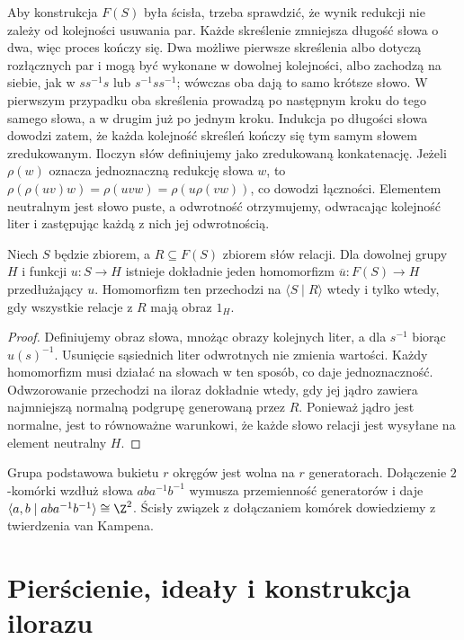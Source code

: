\begin{uwaga}
Aby konstrukcja $F(S)$ była ścisła, trzeba sprawdzić,
że wynik redukcji nie zależy od kolejności usuwania par.
Każde skreślenie zmniejsza długość słowa o dwa, więc
proces kończy się. Dwa możliwe pierwsze skreślenia
albo dotyczą rozłącznych par i mogą być wykonane
w dowolnej kolejności, albo zachodzą na siebie,
jak w $ss^{-1}s$ lub $s^{-1}ss^{-1}$; wówczas
oba dają to samo krótsze słowo. W pierwszym przypadku
oba skreślenia prowadzą po następnym kroku do tego samego
słowa, a w drugim już po jednym kroku. Indukcja po długości
słowa dowodzi zatem, że każda kolejność skreśleń kończy się
tym samym słowem zredukowanym.
Iloczyn słów definiujemy jako zredukowaną konkatenację.
Jeżeli $\rho(w)$ oznacza jednoznaczną redukcję słowa $w$, to
$\rho(\rho(uv)w)=\rho(uvw)=\rho(u\rho(vw))$,
co dowodzi łączności. Elementem neutralnym jest słowo puste,
a odwrotność otrzymujemy, odwracając kolejność liter
i zastępując każdą z nich jej odwrotnością.
\end{uwaga}
\begin{twierdzenie}
Niech $S$ będzie zbiorem, a $R\subseteq F(S)$
zbiorem słów relacji. Dla dowolnej grupy $H$ i funkcji
$u:S\to H$ istnieje dokładnie jeden homomorfizm
$\overline u:F(S)\to H$ przedłużający $u$.
Homomorfizm ten przechodzi na $\langle S\mid R\rangle$ wtedy
i tylko wtedy, gdy wszystkie relacje z $R$ mają obraz $1_H$.
\end{twierdzenie}
\begin{proof}
Definiujemy obraz słowa, mnożąc obrazy kolejnych liter,
a dla $s^{-1}$ biorąc $u(s)^{-1}$. Usunięcie sąsiednich
liter odwrotnych nie zmienia wartości. Każdy homomorfizm
musi działać na słowach w ten sposób, co daje jednoznaczność.
Odwzorowanie przechodzi na iloraz dokładnie wtedy, gdy
jej jądro zawiera najmniejszą normalną podgrupę
generowaną przez $R$. Ponieważ jądro jest normalne,
jest to równoważne warunkowi, że każde słowo relacji
jest wysyłane na element neutralny $H$.
\end{proof}
\begin{przyklad}
Grupa podstawowa bukietu $r$ okręgów jest wolna na $r$
generatorach. Dołączenie $2$-komórki wzdłuż słowa
$aba^{-1}b^{-1}$ wymusza przemienność generatorów i daje
$\langle a,b\mid aba^{-1}b^{-1}\rangle\cong\Z^2$.
Ścisły związek z dołączaniem komórek dowiedziemy z twierdzenia
van Kampena.
\end{przyklad}

\section{Pierścienie, ideały i konstrukcja ilorazu}

